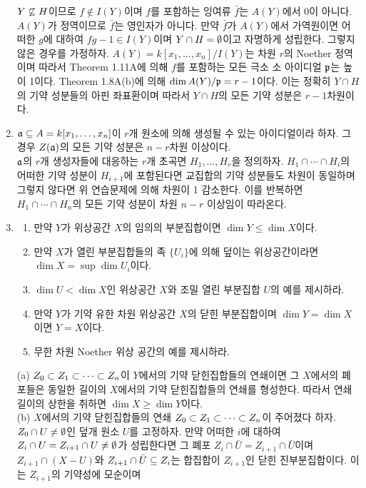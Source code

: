 \begin{enumerate}[label=\tb{1.\arabic*.},itemindent=0mm,itemsep=4mm]
		$Y\not\subseteq H$이므로 $f\notin I(Y)$이며 $f$를 포함하는 잉여류 $\bar f$는 $A(Y)$에서 0이 아니다.
		$A(Y)$가 정역이므로 $\bar f$는 영인자가 아니다.
		만약 $\bar f$가 $A(Y)$에서 가역원이면 어떠한 $g$에 대하여 $fg-1\in I(Y)$이며 $Y\cap H=\emptyset$이고 자명하게 성립한다.
		그렇지 않은 경우를 가정하자. $A(Y)=k[x_1,\ldots,x_n]/I(Y)$는 차원 $r$의 Noether 정역이며
		따라서 Theorem 1.11A에 의해 $f$를 포함하는 모든 극소 소 아이디얼 $\mathfrak{p}$는 높이 1이다.
		Theorem 1.8A(b)에 의해 $\dim A(Y)/\mathfrak{p}=r-1$이다.
		이는 정확히 $Y\cap H$의 기약 성분들의 아핀 좌표환이며 따라서 $Y\cap H$의 모든 기약 성분은 $r-1$차원이다.
		\item $\mathfrak{a}\subseteq A=k[x_1,\ldots,x_n]$이 $r$개 원소에 의해 생성될 수 있는 아이디얼이라 하자.
		그 경우 $Z(\mathfrak{a})$의 모든 기약 성분은 $n-r$차원 이상이다.\\
		\sol $\mathfrak{a}$의 $r$개 생성자들에 대응하는 $r$개 초곡면 $H_1,\ldots,H_r$을 정의하자.
		$H_1\cap\cdots\cap H_i$의 어떠한 기약 성분이 $H_{i+1}$에 포함된다면 교집합의 기약 성분들도 차원이 동일하며
		그렇지 않다면 위 연습문제에 의해 차원이 1 감소한다.
		이를 반복하면 $H_1\cap\cdots\cap H_n$의 모든 기약 성분이 차원 $n-r$ 이상임이 따라온다.
		\item \begin{enumerate}[label=(\alph*)]
			\item 만약 $Y$가 위상공간 $X$의 임의의 부분집합이면 $\dim Y\le\dim X$이다.
			\item 만약 $X$가 열린 부분집합들의 족 $\{U_i\}$에 의해 덮이는 위상공간이라면 $\dim X=\sup\dim U_i$이다.
			\item $\dim U<\dim X$인 위상공간 $X$와 조밀 열린 부분집합 $U$의 예를 제시하라.
			\item 만약 $Y$가 기약 유한 차원 위상공간 $X$의 닫힌 부분집합이며 $\dim Y=\dim X$이면 $Y=X$이다.
			\item 무한 차원 Noether 위상 공간의 예를 제시하라.
		\end{enumerate}
		\sol (a) $Z_0\subset Z_1\subset\cdots\subset Z_n$이 $Y$에서의 기약 닫힌집합들의 연쇄이면
		그 $X$에서의 폐포들은 동일한 길이의 $X$에서의 기약 닫힌집합들의 연쇄를 형성한다.
		따라서 연쇄 길이의 상한을 취하면 $\dim X\ge\dim Y$이다.\\
		(b) $X$에서의 기약 닫힌집합들의 연쇄 $Z_0\subset Z_1\subset\cdots\subset Z_n$이 주어졌다 하자.
		$Z_0\cap U\ne\emptyset$인 덮개 원소 $U$를 고정하자. 만약 어떠한 $i$에 대하여 $Z_i\cap U=Z_{i+1}\cap U\ne\emptyset$가 성립한다면
		그 폐포 $Z_i\cap\bar U=Z_{i+1}\cap\bar U$이며 $Z_{i+1}\cap(X-U)$와 $Z_{i+1}\cap\bar U\subseteq Z_i$는
		합집합이 $Z_{i+1}$인 닫힌 진부분집합이다. 이는 $Z_{i+1}$의 기약성에 모순이며

\end{enumerate}
